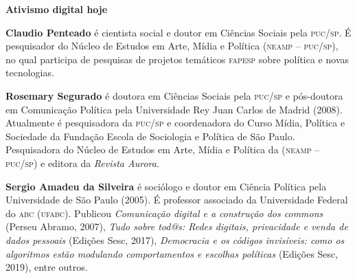 \textbf{Ativismo digital hoje} \lipsum[1]

\textbf{Claudio Penteado} é cientista social e doutor em Ciências Sociais pela \textsc{puc/sp}. É pesquisador do Núcleo de Estudos em Arte, Mídia e Política (\textsc{neamp -- puc/sp}), no qual participa de pesquisas de projetos temáticos \textsc{fapesp} sobre política e novas tecnologias.

\textbf{Rosemary Segurado} é doutora em Ciências Sociais pela \textsc{puc/sp} e pós-doutora em Comunicação Política pela Universidade Rey Juan Carlos de Madrid (2008). Atualmente é pesquisadora da \textsc{puc/sp} e coordenadora do Curso Mídia, Política e Sociedade da Fundação Escola de Sociologia e Política de São Paulo. Pesquisadora do Núcleo de Estudos em Arte, Mídia e Política da (\textsc{neamp -- puc/sp}) e editora da \textit{Revista Aurora}.

\textbf{Sergio Amadeu da Silveira} é sociólogo e doutor em Ciência Política pela Universidade de São Paulo (2005). É professor associado da Universidade Federal do \textsc{abc} (\textsc{ufabc}). Publicou \textit{Comunicação digital e a construção dos commons} (Perseu Abramo, 2007), \textit{Tudo sobre tod@s: Redes digitais, privacidade e venda de dados pessoais} (Edições Sesc, 2017), \textit{Democracia e os códigos invisíveis: como os algoritmos estão modulando comportamentos e escolhas políticas} (Edições Sesc, 2019), entre outros.

